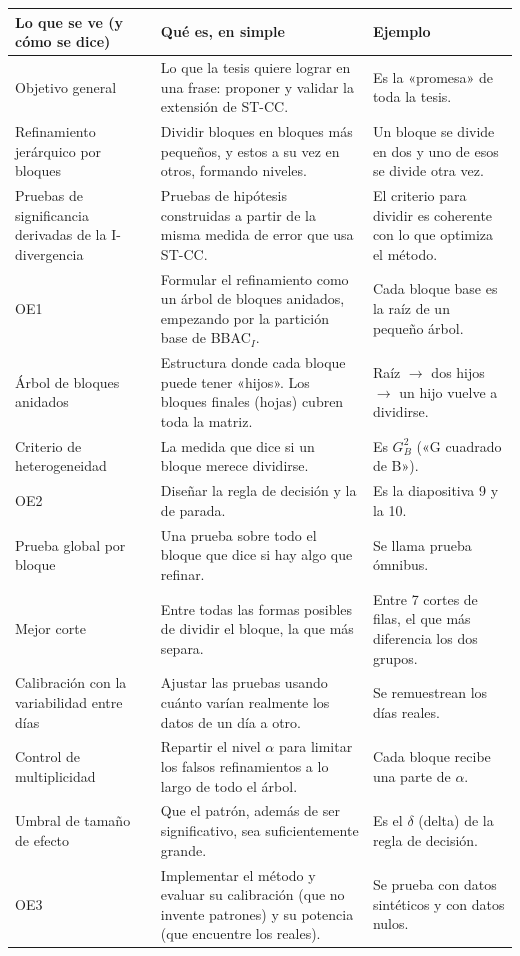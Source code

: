 \documentclass[11pt,a4paper]{article}
\makeatletter
\newenvironment{partes}{%
  \begin{longtable}{@{}>{\raggedright\arraybackslash}p{4.3cm}>{\raggedright\arraybackslash}p{6.0cm}>{\raggedright\arraybackslash}p{5.0cm}@{}}
  \toprule \textbf{Lo que se ve (y cómo se dice)} & \textbf{Qué es, en simple} & \textbf{Ejemplo}\\ \midrule \endhead}{%
  \bottomrule\end{longtable}}
\newcommand{\se}[1]{\newline{\small\color{ucspblue}(se dice «#1»)}}
\makeatother
\begin{document}
\begin{partes}
Objetivo general & Lo que la tesis quiere lograr en una frase: proponer y validar la extensión de ST-CC. & Es la «promesa» de toda la tesis. \\
Refinamiento jerárquico por bloques & Dividir bloques en bloques más pequeños, y estos a su vez en otros, formando niveles. & Un bloque se divide en dos y uno de esos se divide otra vez. \\
Pruebas de significancia derivadas de la I-divergencia & Pruebas de hipótesis construidas a partir de la misma medida de error que usa ST-CC. & El criterio para dividir es coherente con lo que optimiza el método. \\
OE1 \se{o e uno} & Formular el refinamiento como un árbol de bloques anidados, empezando por la partición base de BBAC$_I$. & Cada bloque base es la raíz de un pequeño árbol. \\
Árbol de bloques anidados & Estructura donde cada bloque puede tener «hijos». Los bloques finales (hojas) cubren toda la matriz. & Raíz $\rightarrow$ dos hijos $\rightarrow$ un hijo vuelve a dividirse. \\
Criterio de heterogeneidad & La medida que dice si un bloque merece dividirse. & Es $G^2_B$ («G cuadrado de B»). \\
OE2 \se{o e dos} & Diseñar la regla de decisión y la de parada. & Es la diapositiva 9 y la 10. \\
Prueba global por bloque & Una prueba sobre todo el bloque que dice si hay algo que refinar. & Se llama prueba ómnibus. \\
Mejor corte & Entre todas las formas posibles de dividir el bloque, la que más separa. & Entre 7 cortes de filas, el que más diferencia los dos grupos. \\
Calibración con la variabilidad entre días & Ajustar las pruebas usando cuánto varían realmente los datos de un día a otro. & Se remuestrean los días reales. \\
Control de multiplicidad & Repartir el nivel $\alpha$ para limitar los falsos refinamientos a lo largo de todo el árbol. & Cada bloque recibe una parte de $\alpha$. \\
Umbral de tamaño de efecto & Que el patrón, además de ser significativo, sea suficientemente grande. & Es el $\delta$ (delta) de la regla de decisión. \\
OE3 \se{o e tres} & Implementar el método y evaluar su calibración (que no invente patrones) y su potencia (que encuentre los reales). & Se prueba con datos sintéticos y con datos nulos. \\

\end{partes}
\end{document}
